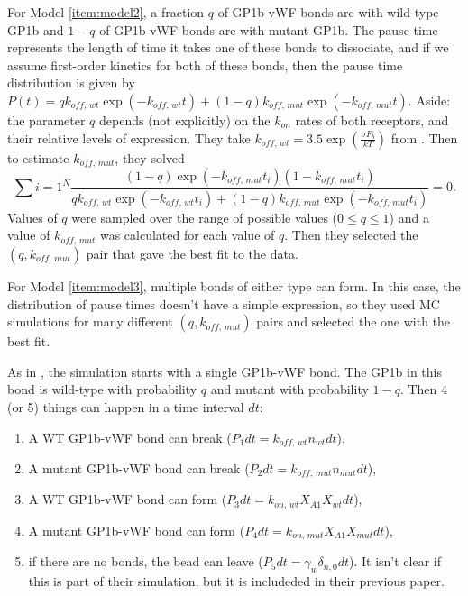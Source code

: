 \documentclass[
10pt, %
letterpaper, %
twocolumn, %
landscape %
]{article}
\newcommand{\kom}{k_\textit{off, mut}}
\newcommand{\kow}{k_\textit{off, wt}}
\begin{document}
For Model \ref{item:model2}, a fraction $q$ of GP1b-vWF bonds are with
wild-type GP1b and $1-q$ of GP1b-vWF bonds are with mutant GP1b. The
pause time represents the length of time it takes one of these bonds
to dissociate, and if we assume first-order kinetics for both of these
bonds, then the pause time distribution is given by $P(t) = q\kow
\exp(-\kow t) + (1-q) \kom \exp(-\kom t)$. Aside: the parameter $q$ depends
(not explicitly) on the $k_\textit{on}$ rates of both receptors, and
their relative levels of expression. They take $\kow = 3.5
\exp\left(\frac{\sigma F_b}{k T}\right)$ from 
\cite{doggett02slk}. 
Then to estimate $\kom$, they solved 
\begin{equation*}
  \sum{i=1}^N \frac{(1-q)\exp(-\kom t_i)(1 - \kom t_i)}{q \kow
    \exp(-\kow t_i) + (1-q) \kom \exp(-\kom t_i)} = 0.
\end{equation*}
Values of $q$ were sampled over the range of possible values ($0 \le q
\le 1$) and a value of $\kom$ was calculated for each value of
$q$. Then they selected the $(q, \kom)$ pair that gave the best fit to
the data.

For Model \ref{item:model3}, multiple bonds of either type can
form. In this case, the distribution of pause times doesn't have a
simple expression, so they used MC simulations for many different $(q,
\kom)$ pairs and selected the one with the best fit. 

As in \cite{doggett02slk},
the simulation starts with a single GP1b-vWF bond. The GP1b in this
bond is wild-type with probability $q$ and mutant with probability
$1-q$. Then 4 (or 5) things can happen in a time interval $dt$:
\begin{enumerate}
\item A WT GP1b-vWF bond can break ($P_1 dt = \kow n_{wt} dt$),
\item A mutant GP1b-vWF bond can break ($P_2 dt = \kom n_{mut} dt$),
\item A WT GP1b-vWF bond can form ($P_3 dt = k_\textit{on, wt} X_{A1}
  X_{wt} dt$),
\item A mutant GP1b-vWF bond can form ($P_4 dt = k_\textit{on, mut}
  X_{A1} X_{mut} dt$),
\item if there are no bonds, the bead can leave ($P_5 dt = \gamma_w
  \delta_{n, 0} dt$). It isn't clear if this is part of their
  simulation, but it is includeded in their previous paper.
\end{enumerate}

\end{document}
